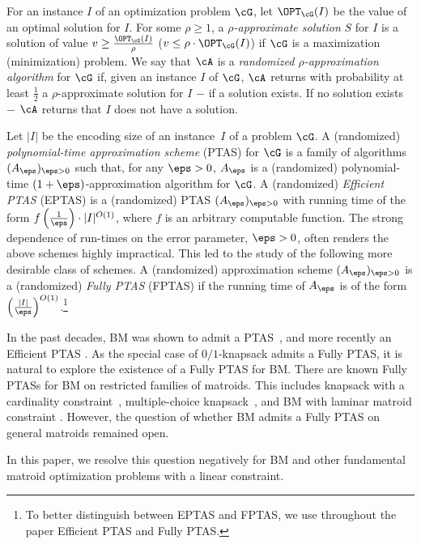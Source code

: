 	
 For an instance $I$ of an optimization problem $\cG$, let $\OPT_{\cG}(I)$ be the value of an optimal solution for $I$. For some $\rho \geq 1$, a {\em $\rho$-approximate solution} $S$ for $I$ is a solution of value $v \geq \frac{\OPT_{\cG}(I)}{\rho}$ ($v \leq \rho \cdot \OPT_{\cG}(I)$) if $\cG$ is a maximization (minimization) problem. 
 We say that $\cA$ is a {\em randomized $\rho$-approximation algorithm} for $\cG$ if,
given an instance $I$ of $\cG$, $\cA$
returns with probability at least $\frac{1}{2}$ a $\rho$-approximate solution for $I$ $-$ if a solution exists. If no solution exists $-$ $\cA$ returns that $I$ does not have a solution.
	

	
	
	
	Let $|I|$ be the encoding size of an instance~$I$ of a problem $\cG$. 
	A (randomized) {\em polynomial-time approximation scheme} (PTAS)
	for $\cG$ is a family of algorithms $(A_{\eps})_{\eps>0}$ such that, for any $\eps>0$, $A_{\eps}$ is a (randomized) polynomial-time $(1+ \eps)$-approximation algorithm for $\cG$. 
	A (randomized) {\em Efficient PTAS} (EPTAS) is a (randomized) PTAS $(A_{\eps})_{\eps>0}$ with running time of the form $f\left(\frac{1}{\eps}\right) \cdot |I|^{O(1)}$, where $f$ is an arbitrary computable function. %
	The strong dependence of run-times on the error parameter, $\eps > 0$, often renders the above schemes highly impractical. This led to the study of the following more desirable class of schemes. A (randomized) approximation scheme 
	$(A_{\eps})_{\eps>0}$ is a (randomized) {\em Fully PTAS} (FPTAS) if the running time of $A_{\eps}$ is of the form $ {\left(\frac{|I|}{\eps}\right)}^{O(1)}$.\footnote{To better distinguish between EPTAS and FPTAS, we use throughout the paper Efficient PTAS and Fully PTAS.}
	
In the past decades, BM was shown to admit a PTAS~\cite{BBGS11,CVZ11,GZ10}, and more recently an Efficient PTAS \cite{DKS23,DKS23b}. As the special case of
$0/1${\sc-knapsack} admits a Fully PTAS, it is natural to explore the existence of a Fully PTAS for BM. There are known Fully PTASs  for BM on restricted families of matroids. This includes {\sc knapsack with a cardinality constraint}~\cite{caprara2000approximation}, 
{\sc multiple-choice knapsack}~\cite{La79}, and {\sc BM with laminar matroid constraint} \cite{DKS23c}. However, the question of whether BM admits a Fully PTAS on general matroids remained open. 

In this paper, we resolve this question negatively for BM and other fundamental matroid optimization problems with a linear constraint. 

